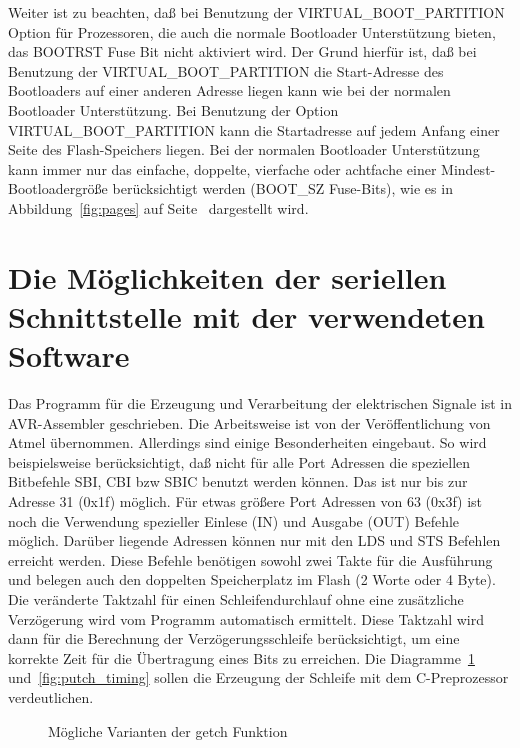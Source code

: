 Weiter ist zu beachten, daß bei Benutzung der VIRTUAL\_BOOT\_PARTITION Option für Prozessoren, die auch
die normale Bootloader Unterstützung bieten, das BOOTRST Fuse Bit nicht aktiviert wird.
Der Grund hierfür ist, daß bei Benutzung der VIRTUAL\_BOOT\_PARTITION die Start-Adresse des Bootloaders
auf einer anderen Adresse liegen kann wie bei der normalen Bootloader Unterstützung.
Bei Benutzung der Option VIRTUAL\_BOOT\_PARTITION kann die Startadresse auf jedem Anfang einer
Seite des Flash-Speichers liegen. Bei der normalen Bootloader Unterstützung kann immer nur das
einfache, doppelte, vierfache oder achtfache einer Mindest-Bootloadergröße berücksichtigt
werden (BOOT\_SZ Fuse-Bits), wie es in Abbildung~\ref{fig:pages} auf Seite~\pageref{fig:pages}
dargestellt wird.

\section{Die Möglichkeiten der seriellen Schnittstelle mit der verwendeten Software}

Das Programm für die Erzeugung und Verarbeitung der elektrischen Signale ist in AVR-Assembler geschrieben.
Die Arbeitsweise ist von der Veröffentlichung von Atmel übernommen.
Allerdings sind einige Besonderheiten eingebaut. 
So wird beispielsweise berücksichtigt, daß nicht für alle Port Adressen die speziellen Bitbefehle SBI, CBI
bzw SBIC benutzt werden können. Das ist nur bis zur Adresse 31 (0x1f) möglich. Für etwas größere
Port Adressen von 63 (0x3f) ist noch die Verwendung spezieller Einlese (IN) und Ausgabe (OUT) Befehle
möglich. Darüber liegende Adressen können nur mit den LDS und STS Befehlen erreicht werden.
Diese Befehle benötigen sowohl zwei Takte für die Ausführung und belegen auch den doppelten
Speicherplatz im Flash (2 Worte oder 4 Byte).
Die veränderte Taktzahl für einen Schleifendurchlauf ohne eine zusätzliche Verzögerung wird 
vom Programm automatisch ermittelt.
Diese Taktzahl wird dann für die Berechnung der Verzögerungsschleife berücksichtigt,
um eine korrekte Zeit für die Übertragung eines Bits zu erreichen. 
Die Diagramme~\ref{fig:getch_timing} und~\ref{fig:putch_timing} sollen  die Erzeugung der Schleife mit
dem C-Preprozessor verdeutlichen.

\begin{figure}[H]
\centering
{}
\caption{Mögliche Varianten der getch Funktion}
\label{fig:getch_timing}
\end{figure}

